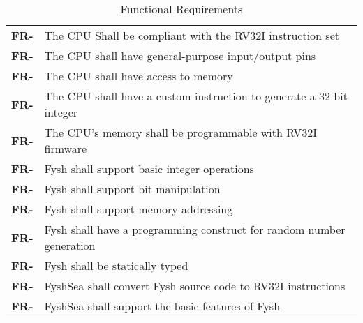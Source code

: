 \resetfyshcounter
\newcommand{\fr}[1]{%
	\textbf{FR-\rc} & #1 \\%
	\hline%
}
\begin{table}[H]
	\begin{tabularx}{\textwidth}{| a | x |}
		\hline
		 &  \\
		\hline
		\fr{The CPU Shall be compliant with the RV32I instruction set}
		\fr{The CPU shall have general-purpose input/output pins}
		\fr{The CPU shall have access to memory}
		\fr{The CPU shall have a custom instruction to generate a 32-bit integer}
		\fr{The CPU's memory shall be programmable with RV32I firmware}
		\fr{Fysh shall support basic integer operations}
		\fr{Fysh shall support bit manipulation}
		\fr{Fysh shall support memory addressing}
		\fr{Fysh shall have a programming construct for random number generation}
		\fr{Fysh shall be statically typed}
		\fr{FyshSea shall convert Fysh source code to RV32I instructions}
		\fr{FyshSea shall support the basic features of Fysh}
	\end{tabularx}
	\caption{Functional Requirements}
\end{table}

